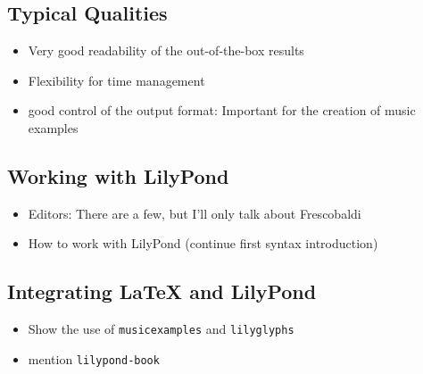 \documentclass[../../LilyPond-Tutorials]{subfiles}
\begin{document}
\subsection*{Typical Qualities}
\begin{itemize}
\item Very good readability of the out-of-the-box results
\item Flexibility for time management
\item good control of the output format: Important for the creation of music examples
\end{itemize}

\subsection*{Working with LilyPond}
\begin{itemize}
\item Editors: There are a few, but I'll only talk about Frescobaldi
\item How to work with LilyPond (continue first syntax introduction)
\end{itemize}

\subsection*{Integrating \LaTeX{} and LilyPond}
\begin{itemize}
\item Show the use of \texttt{musicexamples} and \texttt{lilyglyphs}
\item mention \texttt{lilypond-book}
\end{itemize}
\end{document}
